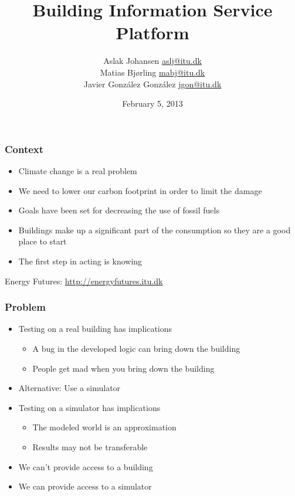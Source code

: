 \documentclass[t]{beamer}
\title{Building Information Service Platform\\\scalebox{0.85}{a Discrete Event Simulator for Building Modeling}}
\author{Aslak Johansen \url{aslj@itu.dk}\\Matias Bjørling \url{mabj@itu.dk}\\Javier González González \url{jgon@itu.dk}}
\date{February 5, 2013}
\begin{document}
\frame{\titlepage}

\begin{frame}
  \frametitle{Context}
  
  \begin{itemize}
    \item Climate change is a real problem
    \item We need to lower our carbon footprint in order to limit the damage
    \item Goals have been set for decreasing the use of fossil fuels
    \item Buildings make up a significant part of the consumption so they are a good place to start
    \item The first step in acting is knowing
  \end{itemize}
  
  Energy Futures: \url{http://energyfutures.itu.dk}
  
\end{frame}

\begin{frame}
  \frametitle{Problem}
  
  \begin{itemize}
    \item Testing on a real building has implications
      \begin{itemize}
        \item A bug in the developed logic can bring down the building
        \item People get mad when you bring down the building
      \end{itemize}
    \item Alternative: Use a simulator
    \item Testing on a simulator has implications
      \begin{itemize}
        \item The modeled world is an approximation
        \item Results may not be transferable
      \end{itemize}
  \end{itemize}
  
  \begin{itemize}
    \item We can't provide access to a building
    \item We can provide access to a simulator
  \end{itemize}
  
\end{frame}
\end{document}
